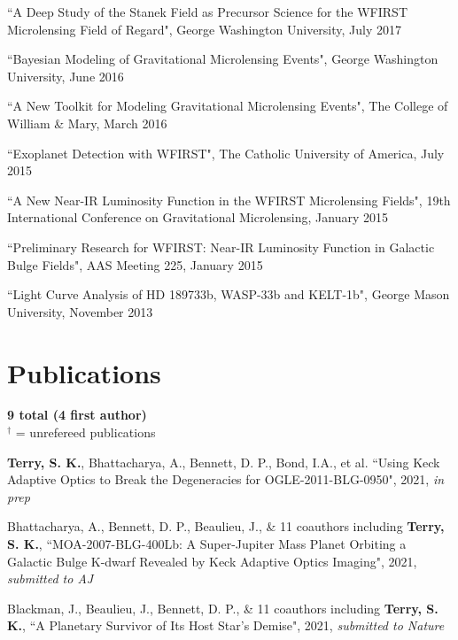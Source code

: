 \documentclass[margin,line]{res}
\begin{document}
\begin{resume}
\begin{etaremune}
\item ``A Deep Study of the Stanek Field as Precursor Science for the WFIRST Microlensing Field of Regard", George Washington University, July 2017

\item ``Bayesian Modeling of Gravitational Microlensing Events", George Washington University, June 2016

\item ``A New Toolkit for Modeling Gravitational Microlensing Events", The College of William \& Mary, March 2016

\item ``Exoplanet Detection with WFIRST", The Catholic University of America, July 2015

\item ``A New Near-IR Luminosity Function in the WFIRST Microlensing Fields", 19th International Conference on Gravitational Microlensing, January 2015

\item ``Preliminary Research for WFIRST: Near-IR Luminosity Function in Galactic Bulge Fields", AAS Meeting 225, January 2015

\item ``Light Curve Analysis of HD 189733b, WASP-33b and KELT-1b", George Mason University, November 2013

\end{etaremune}

\section{\sc Publications}
\textbf{9 total (4 first author)}\\
$^{\dagger}$ = unrefereed publications \\
\begin{etaremune}
\item \textbf{Terry, S. K.}, Bhattacharya, A., Bennett, D. P., Bond, I.A., et al. ``Using Keck Adaptive Optics to Break the Degeneracies for OGLE-2011-BLG-0950", 2021, \textit{in prep}

\item Bhattacharya, A., Bennett, D. P., Beaulieu, J., \& 11 coauthors including \textbf{Terry, S. K.}, ``MOA-2007-BLG-400Lb: A Super-Jupiter Mass Planet Orbiting a Galactic Bulge K-dwarf Revealed by Keck Adaptive Optics Imaging", 2021, \textit{submitted to AJ}

\item Blackman, J., Beaulieu, J., Bennett, D. P., \& 11 coauthors including {\bf Terry, S. K.}, ``A Planetary Survivor of Its Host Star's Demise", 2021, \textit{submitted to Nature}


\end{etaremune}
\end{resume}
\end{document}
